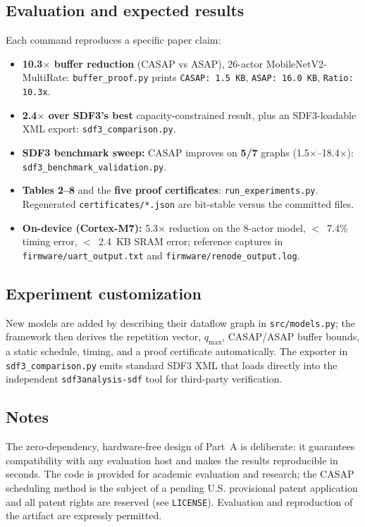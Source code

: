 \documentclass[10pt]{article}
\begin{document}
\subsection{Evaluation and expected results}
Each command reproduces a specific paper claim:
\begin{itemize}
  \item {\bf 10.3$\times$ buffer reduction} (CASAP vs ASAP), 26-actor
        MobileNetV2-MultiRate: \texttt{buffer\_proof.py} prints
        \texttt{CASAP: 1.5 KB}, \texttt{ASAP: 16.0 KB}, \texttt{Ratio: 10.3x}.
  \item {\bf 2.4$\times$ over SDF3's best} capacity-constrained result, plus an
        SDF3-loadable XML export: \texttt{sdf3\_comparison.py}.
  \item {\bf SDF3 benchmark sweep:} CASAP improves on {\bf 5/7} graphs
        (1.5$\times$--18.4$\times$): \texttt{sdf3\_benchmark\_validation.py}.
  \item {\bf Tables 2--8} and the {\bf five proof certificates}:
        \texttt{run\_experiments.py}. Regenerated \texttt{certificates/*.json}
        are bit-stable versus the committed files.
  \item {\bf On-device (Cortex-M7):} 5.3$\times$ reduction on the 8-actor model,
        $<$~7.4\% timing error, $<$~2.4~KB SRAM error; reference captures in
        \texttt{firmware/uart\_output.txt} and \texttt{firmware/renode\_output.log}.
\end{itemize}

\subsection{Experiment customization}
New models are added by describing their dataflow graph in
\texttt{src/models.py}; the framework then derives the repetition vector,
$q_{\max}$, CASAP/ASAP buffer bounds, a static schedule, timing, and a proof
certificate automatically. The exporter in \texttt{sdf3\_comparison.py} emits
standard SDF3 XML that loads directly into the independent
\texttt{sdf3analysis-sdf} tool for third-party verification.

\subsection{Notes}
The zero-dependency, hardware-free design of Part~A is deliberate: it guarantees
compatibility with any evaluation host and makes the results reproducible in
seconds. The code is provided for academic evaluation and research; the CASAP
scheduling method is the subject of a pending U.S. provisional patent
application and all patent rights are reserved (see \texttt{LICENSE}).
Evaluation and reproduction of the artifact are expressly permitted.
\end{document}
